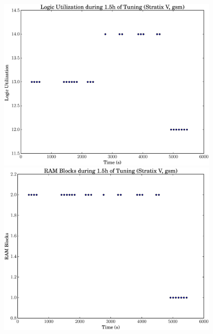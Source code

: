 \documentclass[12pt, a4paper]{article}
\begin{document}
\begin{figure}[htpb]
    \centering
    \noindent
    \begin{minipage}{.48\textwidth}
        \centering
        \includegraphics[scale=.25]{gsm_lu_5400_chstone_StratixV}
    \end{minipage}%
    \hfill
    \begin{minipage}{.48\textwidth}
        \centering
        \includegraphics[scale=.25]{gsm_ram_5400_chstone_StratixV}
    \end{minipage}%


\end{figure}
\end{document}
